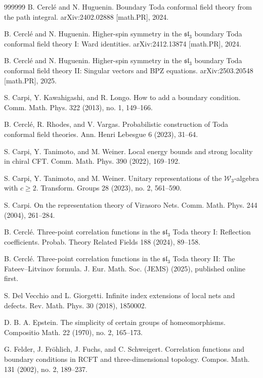 \documentclass[11pt,b5paper,notitlepage]{article}
\theoremstyle{definition}
\theoremstyle{plain}
\numberwithin{equation}{section}
\begin{document}
\begin{thebibliography}{999999}
B. Cercl\'e and N. Huguenin.
Boundary Toda conformal field theory from the path integral.
arXiv:2402.02888 [math.PR], 2024.

B. Cercl\'e and N. Huguenin.
Higher-spin symmetry in the $\mathfrak{sl}_3$ boundary Toda conformal field theory I: Ward identities.
arXiv:2412.13874 [math.PR], 2024.

B. Cercl\'e and N. Huguenin.
Higher-spin symmetry in the $\mathfrak{sl}_3$ boundary Toda conformal field theory II: Singular vectors and BPZ equations.
arXiv:2503.20548 [math.PR], 2025.

S. Carpi, Y. Kawahigashi, and R. Longo.
How to add a boundary condition.
Comm. Math. Phys. 322 (2013), no. 1, 149--166.

B. Cercl\'e, R. Rhodes, and V. Vargas.
Probabilistic construction of Toda conformal field theories.
Ann. Henri Lebesgue 6 (2023), 31--64.

S. Carpi, Y. Tanimoto, and M. Weiner.
Local energy bounds and strong locality in chiral CFT.
Comm. Math. Phys. 390 (2022), 169--192.


S. Carpi, Y. Tanimoto, and M. Weiner.
Unitary representations of the $\mathcal{W}_3$-algebra with $c\geq 2$.
Transform. Groups 28 (2023), no. 2, 561--590.

S. Carpi. On the representation theory of Virasoro Nets. Comm. Math. Phys. 244 (2004), 261--284.

B. Cercl\'e.
Three-point correlation functions in the $\mathfrak{sl}_3$ Toda theory I: Reflection coefficients.
Probab. Theory Related Fields 188 (2024), 89--158.

B. Cercl\'e.
Three-point correlation functions in the $\mathfrak{sl}_3$ Toda theory II: The Fateev--Litvinov formula.
J. Eur. Math. Soc. (JEMS) (2025), published online first.

S. Del Vecchio and L. Giorgetti.
Infinite index extensions of local nets and defects.
Rev. Math. Phys. 30 (2018), 1850002.

D. B. A. Epstein.
The simplicity of certain groups of homeomorphisms.
Compositio Math. 22 (1970), no. 2, 165--173.

G. Felder, J. Fr\"ohlich, J. Fuchs, and C. Schweigert.
Correlation functions and boundary conditions in RCFT and three-dimensional topology. Compos. Math. 131 (2002), no. 2, 189--237.


\end{thebibliography}
\end{document}
